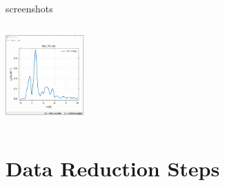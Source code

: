 \begin{slide}{ {\xasviewer} screenshots}
\begin{cenpage}{145mm}
\begin{columns}
\begin{column}{30mm}
        \vmm
        \includegraphics[width=30mm]{figs/Screenshots/XASViewer_EXAFS_plot_chir}

        \vmm \vfill
    \end{column}
\end{columns}






 \end{cenpage}
\end{slide}


\section{Data Reduction Steps}

